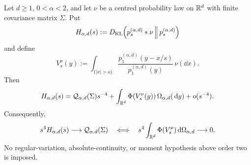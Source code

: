 \begin{theorem}
\label{thm:stable-law-by-law-decomposition}
Let \(d\ge1\), \(0<\alpha<2\), and let \(\nu\) be a centred probability law
on \(\mathbb{R}^d\) with finite covariance matrix \(\Sigma\).  Put
\[
 H_{\alpha,d}(s):=
 D_{\rm KL}\!\left(p_s^{(\alpha,d)}*\nu\,\middle\|\,
 p_s^{(\alpha,d)}\right)
\]
and define
\begin{equation}\label{eq:stable-raw-tail-potential}
 V_s^\nu(y):=\int_{\{|x|>s\}}
 \frac{p_1^{(\alpha,d)}(y-x/s)}
      {p_1^{(\alpha,d)}(y)}\,\nu(\dd x).
\end{equation}
Then
\begin{equation}\label{eq:stable-law-by-law-decomposition}
 H_{\alpha,d}(s)=\mathcal Q_{\alpha,d}(\Sigma)s^{-4}
 +\int_{\mathbb{R}^d}\Phi(V_s^\nu(y))\,\Omega_{\alpha,d}(\,\mathrm{d} y)
 +o(s^{-4}).
\end{equation}
Consequently,
\begin{equation}\label{eq:stable-law-by-law-criterion}
 s^4H_{\alpha,d}(s)\longrightarrow\mathcal Q_{\alpha,d}(\Sigma)
 \quad\Longleftrightarrow\quad
 s^4\int_{\mathbb{R}^d}\Phi(V_s^\nu)\,\mathrm{d}\Omega_{\alpha,d}\longrightarrow0.
\end{equation}
No regular-variation, absolute-continuity, or moment hypothesis above order two
is imposed.
\end{theorem}

